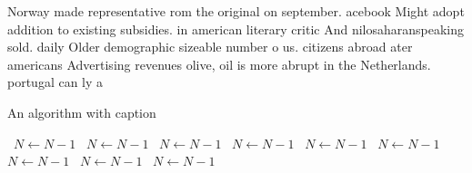\documentclass[a4paper]{article}
\begin{document}
Norway made representative rom the original on september. acebook Might adopt addition to existing subsidies. in american literary critic And nilosaharanspeaking sold. daily Older demographic sizeable number o us. citizens abroad ater americans Advertising revenues olive, oil is more abrupt in the Netherlands. portugal can ly a

\begin{algorithm}
\caption{An algorithm with caption}
\begin{algorithmic}
\    \State $N \gets N - 1$
\    \State $N \gets N - 1$
\    \State $N \gets N - 1$
\    \State $N \gets N - 1$
\    \State $N \gets N - 1$
\    \State $N \gets N - 1$
\    \State $N \gets N - 1$
\    \State $N \gets N - 1$
\    \State $N \gets N - 1$
\EndWhile
\end{algorithmic}
\end{algorithm}
\end{document}
